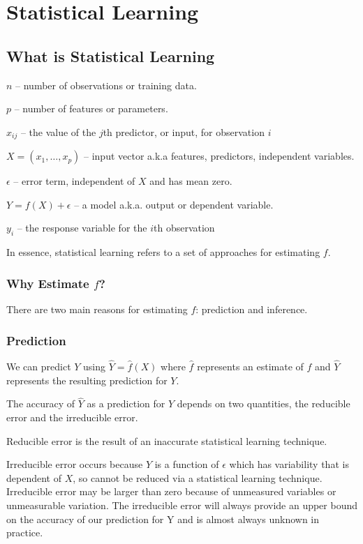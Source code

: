 \documentclass{article}
\begin{document}
\section{Statistical Learning}
\subsection{What is Statistical Learning}
$n$ -- number of observations or training data.

$p$ -- number of features or parameters.

$x_{ij}$ -- the value of the $j$th predictor, or input, for observation $i$

$X = (x_1, \dots, x_p)$  -- input vector a.k.a features, predictors, independent variables.

$\epsilon$  -- error term, independent of $X$ and has mean zero.

$Y = f(X) + \epsilon$ -- a model a.k.a. output or dependent variable.

$y_i$ -- the response variable for the $i$th observation

In essence, statistical learning refers to a set of approaches for estimating $f$. 

\subsubsection{Why Estimate \texorpdfstring{$f$}{f}?}
There are two main reasons for estimating $f$: prediction and inference. 

\subsubsection*{Prediction}

We can predict $Y$ using $\hat Y = \hat f(X)$ where $\hat f$ represents an estimate of $f$ and $\hat Y$ represents the resulting prediction for $Y$.

The accuracy of $\hat Y$ as a prediction for $Y$ depends on two quantities, the reducible error and the irreducible error. 

Reducible error is the result of an inaccurate statistical learning technique.

Irreducible error occurs because $Y$ is a function of $\epsilon$ which has variability that is dependent of $X$, so cannot be reduced via a statistical learning technique. Irreducible error may be larger than zero because of unmeasured variables or unmeasurable variation. The irreducible error will always provide an upper bound on the accuracy of our prediction for Y and is almost always unknown in practice.
\end{document}
